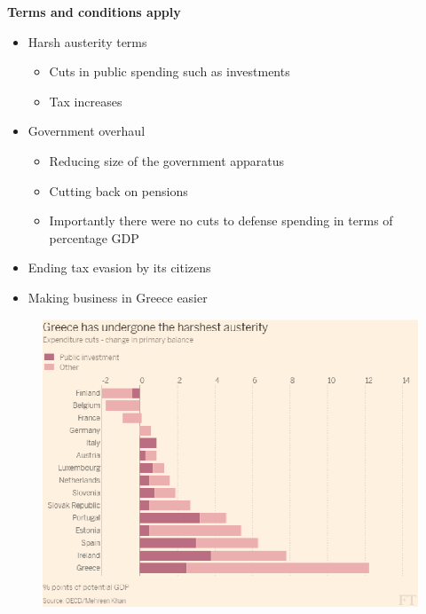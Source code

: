 \documentclass{beamer}
\begin{document}
\begin{frame}
  \textbf{Terms and conditions apply}
  \begin{itemize}
    \item Harsh austerity terms 
  \begin{itemize}
    \item Cuts in public spending such as investments 
    \item Tax increases    
  \end{itemize}
  \item Government overhaul
  \begin{itemize}
    \item Reducing size of the government apparatus
    \item Cutting back on pensions
    \item Importantly there were no cuts to defense spending in terms of percentage GDP    
  \end{itemize}
  \item Ending tax evasion by its citizens
  \item Making business in Greece easier  
  \end{itemize}
\end{frame}

\begin{frame}
  \begin{figure}
    \includegraphics[scale=.8]{austerity.eps}
  \end{figure}
\end{frame}
\end{document}
